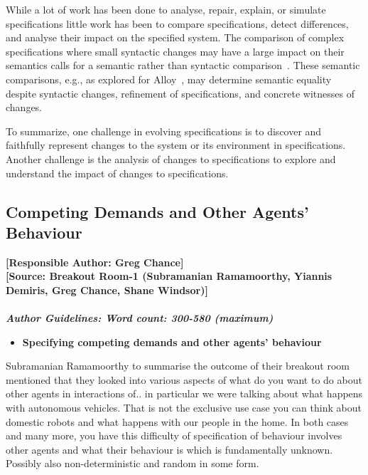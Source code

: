 \documentclass[sigconf]{acmart}
\begin{document}
While a lot of work has been done to analyse, repair, explain, or simulate specifications little work has been to compare specifications, detect differences, and analyse their impact on the specified system. The comparison of complex specifications where small syntactic changes may have a large impact on their semantics calls for a semantic rather than syntactic comparison~\cite{MaozRR14j}. These semantic comparisons, e.g., as explored for Alloy~\cite{RingertW20}, may determine semantic equality despite syntactic changes, refinement of specifications, and concrete witnesses of changes.

To summarize, one challenge in evolving specifications is to discover and faithfully represent changes to the system or its environment in specifications. 
Another challenge is the analysis of changes to specifications to explore and understand the impact of changes to specifications.

\subsection{Competing Demands and Other Agents' Behaviour}
\noindent\textbf{[Responsible Author:  Greg Chance]}\\
\noindent \textbf{[Source: Breakout Room-1 (Subramanian Ramamoorthy, Yiannis Demiris, Greg Chance, Shane Windsor)]}\\\\
\noindent\textbf{\textit{Author Guidelines: Word count: 300-580 (maximum)}}\\
\begin{itemize}
 	\item \textbf{Specifying competing demands and other agents' behaviour}
 \end{itemize}
Subramanian Ramamoorthy to summarise the outcome of their breakout room mentioned that they looked into various aspects of what do you want to do about other agents in interactions of.. in particular we were talking about what happens with autonomous vehicles. That is not the exclusive use case you can think about domestic robots and what happens with our people in the home. In both cases and many more, you have this difficulty of specification of behaviour involves other agents and what their behaviour is which is fundamentally unknown. Possibly also non-deterministic and random in some form.\\
\end{document}
